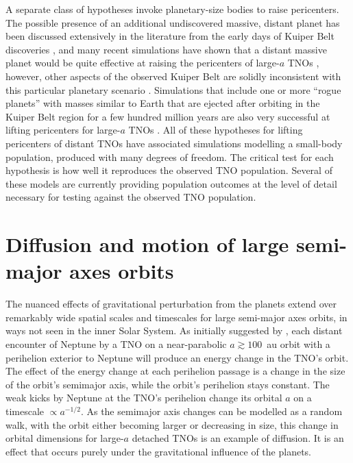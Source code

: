 \documentclass{aastex62}
\begin{document}
A separate class of hypotheses invoke planetary-size bodies to raise pericenters.
The possible presence of an additional undiscovered massive, distant planet has been discussed extensively in the literature from the early days of Kuiper Belt discoveries \citep{gladman02,brownetal04,LykawkaMukai2008,soaresgomes13,trujillosheppard14}, and many recent simulations have shown that a distant massive planet would be quite effective at raising the pericenters of large-$a$ TNOs \citep{batyginbrown16,shankman17,lawler2017,Lietal2018}, however, other aspects of the observed Kuiper Belt are solidly inconsistent with this particular planetary scenario \citep{lawler2017,shankman17,shankman17bias}.  
Simulations that include one or more ``rogue planets'' with masses similar to Earth that are ejected after orbiting in the Kuiper Belt region for a few hundred million years are also very successful at lifting pericenters for large-$a$ TNOs \citep{gladmanchan06,silsbee18}.
All of these hypotheses for lifting pericenters of distant TNOs have associated simulations modelling a small-body population, produced with many degrees of freedom. 
The critical test for each hypothesis is how well it reproduces the observed TNO population. 
Several of these models are currently providing population outcomes at the level of detail necessary for testing against the observed TNO population.

\section{Diffusion and motion of large semi-major axes orbits} \label{sec:diffusion}

The nuanced effects of gravitational perturbation from the planets extend over remarkably wide spatial scales and timescales for large semi-major axes orbits, in ways not seen in the inner Solar System.
As initially suggested by \citet{Duncan1987}, each distant encounter of Neptune by a TNO on a near-parabolic $a \gtrsim 100$~au orbit with a perihelion exterior to Neptune will produce an energy change in the TNO's orbit. 
The effect of the energy change at each perihelion passage is a change in the size of the orbit's semimajor axis, while the orbit's perihelion stays constant.
The weak kicks by Neptune at the TNO's perihelion change its orbital $a$ on a timescale $\propto a^{-1/2}$.
As the semimajor axis changes can be modelled as a random walk, with the orbit either becoming larger or decreasing in size, this change in orbital dimensions for large-$a$ detached TNOs is an example of diffusion.
It is an effect that occurs purely under the gravitational influence of the planets.
\end{document}

